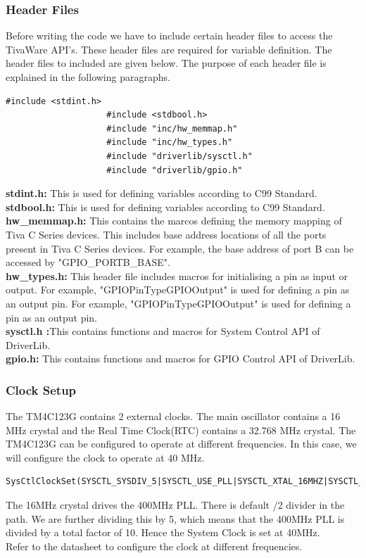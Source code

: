 \documentclass[a4paper,10pt,oneside]{article}
\begin{document}
{			\subsubsection{\textbf{Header Files}}
				{Before writing the code we have to include certain header files to access the TivaWare API's. These header files are required for variable definition. The header files to included are given below. The purpose of each header file is explained in the following paragraphs.
				\begin{lstlisting}[style=CStyle]
					#include <stdint.h>
					#include <stdbool.h>
					#include "inc/hw_memmap.h"
					#include "inc/hw_types.h"
					#include "driverlib/sysctl.h" 
					#include "driverlib/gpio.h"				\end{lstlisting}
				\textbf{stdint.h: }This is used for defining variables according to C99 Standard.\\
				\textbf{stdbool.h: }This is used for defining variables according to C99 Standard.\\
				\textbf{hw\_memmap.h: }This contains the marcos defining the memory mapping of Tiva C Series devices. This includes base address locations of all the ports present in Tiva C Series devices. For example, the base address of port B can be accessed by "GPIO\_PORTB\_BASE". \\
				\textbf{hw\_types.h: }This header file includes macros for initialising a pin as input or output. For example, "GPIOPinTypeGPIOOutput" is used for defining a pin as an output pin. For example, "GPIOPinTypeGPIOOutput" is used for defining a pin as an output pin.  \\ 
				\textbf{sysctl.h :}This contains functions and macros for System Control API of DriverLib. \\
				\textbf{gpio.h: }This contains functions and macros for GPIO Control API of DriverLib. }
			\subsubsection{\textbf{Clock Setup}}
				{The TM4C123G contains 2  external clocks. The main oscillator contains a 16 MHz crystal and the Real Time Clock(RTC) contains a 32.768 MHz crystal. The TM4C123G can be configured to operate at different frequencies. In this case, we will configure the clock to operate at 40 MHz.}
				\begin{lstlisting}[style=CStyle]
					SysCtlClockSet(SYSCTL_SYSDIV_5|SYSCTL_USE_PLL|SYSCTL_XTAL_16MHZ|SYSCTL_OSC_MAIN); \end{lstlisting}
				{The 16MHz crystal drives the 400MHz PLL. There is default /2 divider in the path. We are further dividing this by 5, which means that the 400MHz PLL is divided by a total factor of 10. Hence the System Clock is set at 40MHz.\\
				Refer to the datasheet to configure the clock at different frequencies.} 	
}
\end{document}
